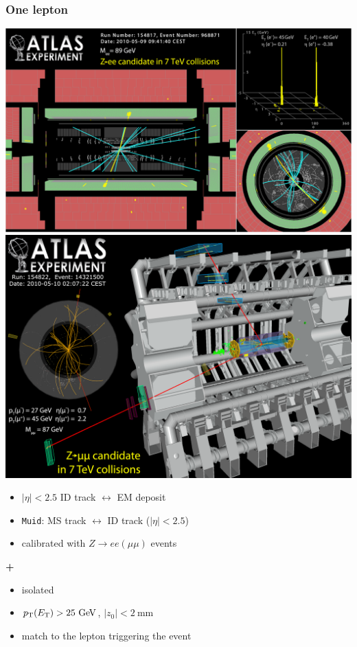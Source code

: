 \begin{frame}\frametitle{One lepton}
\footnotesize\centering

\includegraphics[width=.5\textwidth,height=0.5\textheight]{pics/Zee}
\includegraphics[width=.5\textwidth,height=0.5\textheight]{pics/Zmumu}

\begin{minipage}{.5\textwidth}\centering

\begin{itemize}
\item $|\eta|<2.5$ ID track $\leftrightarrow$ EM deposit
\end{itemize}

\end{minipage}\begin{minipage}{.5\textwidth}\centering

\begin{itemize}
\item \texttt{Muid}: MS track $\leftrightarrow$ ID track ($|\eta|<2.5$)
\end{itemize}

\end{minipage}

\begin{minipage}{.5\textwidth}\centering

\begin{itemize}
\item calibrated with $Z\to ee (\mu\mu)$ events
\end{itemize}
{\cccolor \bfseries \large +}\\
\begin{itemize}
\item isolated
\item $\pt (\et) > 25\gev$, $|z_0|<2~$mm
\item match to the lepton triggering the event
\end{itemize}
\end{minipage}

\end{frame}



